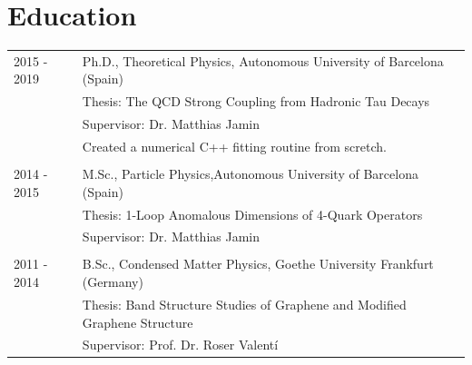 \documentclass[11pt]{article}
\begin{document}
\begin{tabularx}{\textwidth}{lX}
  
\end{tabularx}


\section*{Education}
\begin{tabularx}{\textwidth}{sX}
  2015 - 2019  & Ph.D., Theoretical Physics, Autonomous University of
                 Barcelona (Spain) \\
               & Thesis: The QCD Strong Coupling from Hadronic Tau
                 Decays \\
               & Supervisor: Dr. Matthias Jamin \\
               & Created a numerical C++ fitting routine from scretch. \\\\
  2014 - 2015  & M.Sc., Particle Physics,Autonomous University of
                                Barcelona (Spain) \\
               & Thesis: 1-Loop Anomalous Dimensions of 4-Quark
                 Operators \\
               & Supervisor: Dr. Matthias Jamin \\\\
  2011 - 2014  & B.Sc., Condensed Matter Physics, Goethe University Frankfurt (Germany) \\
               & Thesis: Band Structure Studies of Graphene and Modified
                 Graphene Structure \\
               & Supervisor: Prof. Dr. Roser Valentí
\end{tabularx}
		
\end{document}
